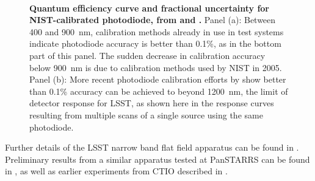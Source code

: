\documentclass[12pt,preprint]{aastex}
\begin{document}
\begin{figure}
\centering
{} \\
\caption{{\small
{\bf Quantum efficiency curve and fractional uncertainty for
NIST-calibrated photodiode, from \citet{Stubbs2010a} and
\citet{Eppeldauer09}.}  Panel (a): Between 400 and 900~nm, calibration
methods already in use in test systems indicate photodiode accuracy is
better than 0.1\%, as in the bottom part of this panel.  The sudden
decrease in calibration accuracy below 900~nm is due to calibration
methods used by NIST in 2005. Panel (b): More recent photodiode
calibration efforts by \citet{Eppeldauer09} show better than 0.1\%
accuracy can be achieved to beyond 1200~nm, the limit of detector
response for LSST, as shown here in the response curves resulting from
multiple scans of a single source using the same photodiode.} }
\label{fig:NIST_diode}
\end{figure}

Further details of the LSST narrow band flat field apparatus can be
found in \citet{Gressler2010}.  Preliminary results from a similar
apparatus tested at PanSTARRS can be found in \citet{Stubbs2010a}, as
well as earlier experiments from CTIO described in
\citet{Stubbs2007a}.
\end{document}
